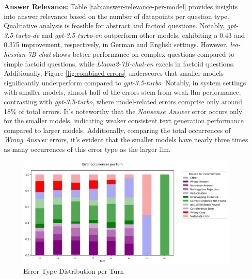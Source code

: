 \noindent\textbf{Answer Relevance:} Table \ref{tab:answer-relevance-per-model} provides insights into answer relevance based on the number of datapoints per question type. Qualitative analysis is feasible for abstract and factoid questions. Notably, \textit{gpt-3.5-turbo-de} and \textit{gpt-3.5-turbo-en} outperform other models, exhibiting a 0.43 and 0.375 improvement, respectively, in German and English settings. However, \textit{leo-hessian-7B-chat} shows better performance on complex questions compared to simple factoid questions, while \textit{Llama2-7B-chat-en} excels in factoid questions. Additionally, Figure \ref{fig:combined-errors} underscores that smaller models significantly underperform compared to \textit{gpt-3.5-turbo}. Notably, in system settings with smaller models, almost half of the errors stem from weak \gls{llm} performance, contrasting with \textit{gpt-3.5-turbo}, where model-related errors comprise only around 18\% of total errors. It's noteworthy that the \textit{Nonsense Answer} error occurs only for the smaller models, indicating weaker consistent text generation performance compared to larger models. Additionally, comparing the total occurrences of \textit{Wrong Answer} errors, it's evident that the smaller models have nearly three times as many occurrences of this error type as the larger \gls{llm}.


\begin{figure}[h]
    \centering
    \includegraphics[width=\textwidth]{Grafiken/Evaluation/EndToEnd/Turns-Errors.png}
    \caption{Error Type Distribution per Turn}
    \label{fig:question-type-turn}
\end{figure}

